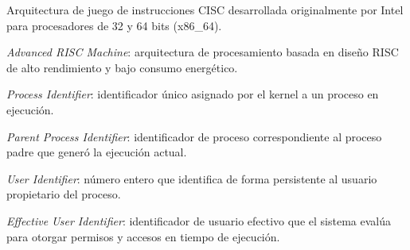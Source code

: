 \begin{abbreviations}
  \item[x86] Arquitectura de juego de instrucciones CISC desarrollada originalmente por Intel para procesadores de 32 y 64 bits (x86\_64).
  \item[ARM] \textit{Advanced RISC Machine}: arquitectura de procesamiento basada en diseño RISC de alto rendimiento y bajo consumo energético.
  \item[PID] \textit{Process Identifier}: identificador único asignado por el kernel a un proceso en ejecución.
  \item[PPID] \textit{Parent Process Identifier}: identificador de proceso correspondiente al proceso padre que generó la ejecución actual.
  \item[UID] \textit{User Identifier}: número entero que identifica de forma persistente al usuario propietario del proceso.
  \item[EUID] \textit{Effective User Identifier}: identificador de usuario efectivo que el sistema evalúa para otorgar permisos y accesos en tiempo de ejecución.
\end{abbreviations}
